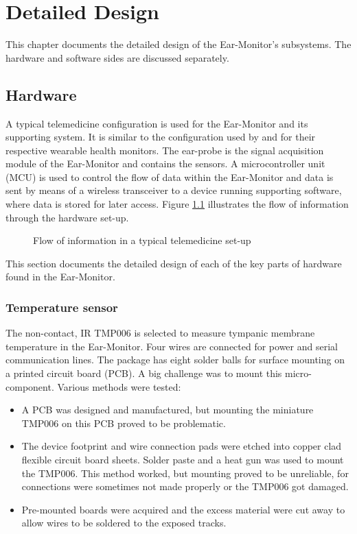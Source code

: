 \chapter{Detailed Design}
\label{chp:Detailed Design}
This chapter documents the detailed design of the Ear-Monitor's subsystems. The hardware and software sides are discussed separately. 

\section{Hardware}

A typical telemedicine configuration is used for the Ear-Monitor and its supporting system. It is similar to the configuration used by \cite{wang2010wearable} and \cite{prawiro2016integrated} for their respective wearable health monitors. The ear-probe is the signal acquisition module of the Ear-Monitor and contains the sensors. A microcontroller unit (MCU) is used to control the flow of data within the Ear-Monitor and data is sent by means of a wireless transceiver to a device running supporting software, where data is stored for later access. Figure \ref{fig:HardwareFlowchart} illustrates the flow of information through the hardware set-up.

\begin{figure}[h]
\centering
\graphicspath{{figs/}}

\caption{Flow of information in a typical telemedicine set-up}
\label{fig:HardwareFlowchart}
\end{figure}

This section documents the detailed design of each of the key parts of hardware found in the Ear-Monitor.

\subsection{Temperature sensor}
The non-contact, IR TMP006 is selected to measure tympanic membrane temperature in the Ear-Monitor. Four wires are connected for power and serial communication lines. The package has eight solder balls for surface mounting on a printed circuit board (PCB). A big challenge was to mount this micro-component. Various methods were tested:

\begin{itemize}
\item A PCB was designed and manufactured, but mounting the miniature TMP006 on this PCB proved to be problematic.
\item The device footprint and wire connection pads were etched into copper clad flexible circuit board sheets. Solder paste and a heat gun was used to mount the TMP006. This method worked, but mounting proved to be unreliable, for connections were sometimes not made properly or the TMP006 got damaged.
\item Pre-mounted boards were acquired and the excess material were cut away to allow wires to be soldered to the exposed tracks.
\end{itemize}

